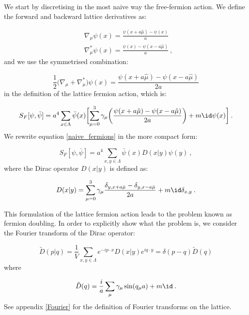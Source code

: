 We start by discretising in the most naive way the free-fermion action. We define the forward and backward lattice derivatives as:

\begin{equation}
\begin{split}
&\nabla_{\mu} \psi(x) = \frac{ \psi(x+a\hat\mu) - \psi(x) }{a} \\
&\nabla^*_{\mu} \psi(x) = \frac{ \psi(x) - \psi(x - a\hat\mu)  }{a}\: ,
\end{split}
\end{equation}
%
and we use the symmetrised combination:

\begin{equation}
\frac{1}{2} \bigl( \nabla_{\mu} + \nabla^*_{\mu} \bigr) \psi(x) = \frac{ \psi(x+a\hat\mu) - \psi(x -  a\hat\mu)}{2a}
\end{equation}
%
in the definition of the lattice fermion action, which is:

\begin{equation}
S_F [\psi,\bar\psi] = a^4 \sum_{x \in \Lambda} \bar \psi(x) \biggl[ \sum_{\mu = 0}^3 \gamma_{\mu} \biggl( \frac{\psi(x+a\hat\mu) - \psi(x - a\hat\mu)}{2a} \biggr) + m\id\psi(x) \biggr] \: .
\label{naive_fermions}
\end{equation}
%
We rewrite equation \ref{naive_fermions} in the more compact form:

\begin{equation}
S_F [\psi,\bar\psi] = a^4 \sum_{x,y \in \Lambda } \bar \psi(x) D(x \vert y) \psi(y) \: ,
\end{equation}
%
where the Dirac operator $D(x\vert y)$ is defined as:

\begin{equation}
D(x \vert y) = \sum_{\mu = 0}^3  \gamma_{\mu} \frac{\delta_{y,x+a\hat\mu} - \delta_{y,x-a\hat\mu}}{2a} + m \id \delta_{x,y} \: .
\end{equation}


This formulation  of the lattice fermion action leads to the problem known as fermion doubling. In order to explicitly show what the problem is, we consider the Fourier transform of the Dirac operator:

\begin{equation}
\tilde D(p \vert q) = \frac{1}{V} \sum_{x,y \in \Lambda} e^{-ip \cdot x} D( x \vert y) e^{i q \cdot y } = \delta(p-q) \tilde D(q)
\end{equation}
%
where

\begin{equation}
\tilde D(q) = \frac{i}{a} \sum_{\mu} \gamma_{\mu} \sin (q_{\mu} a) + m \id \: .
\label{naive_f_mom_space}
\end{equation}
%
 See appendix \ref{Fourier} for the definition of Fourier transforms on the lattice.

